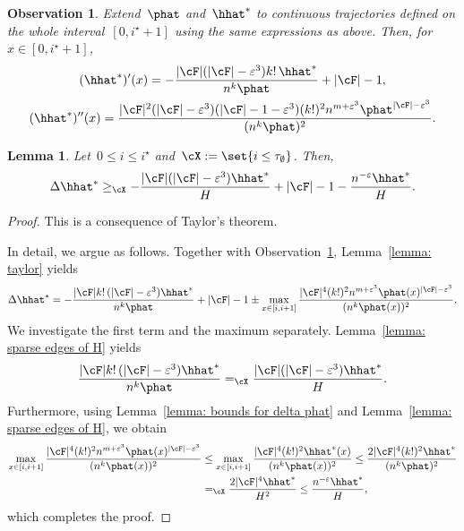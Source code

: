 \documentclass[11pt]{amsart}
\newcommand{\eps}{\varepsilon}
\DeclarePairedDelimiter{\abs}{\lvert}{\rvert}
\newcommand{\Xeq}{=_{\cX}}
\newcommand{\Xgeq}{\geq_{\cX}}
\newtheorem{lemma}[algocf]{Lemma}
\newtheorem{observation}[algocf]{Observation}
\theoremstyle{definition}
\numberwithin{equation}{section}
\begin{document}
	
	\begin{observation}\label{observation: hhat derivatives}
		Extend~$\phat$ and~$\hhat^*$ to continuous trajectories defined on the whole interval~$[0,i^\star+1]$ using the same expressions as above.
		Then, for~$x\in[0,i^\star+1]$,
		\begin{equation*}
			\begin{gathered}
				(\hhat^*)'(x)=-\frac{\abs{\cF}(\abs{\cF}-\eps^3)k!\,\hhat^*}{n^k\phat}+\abs{\cF}-1,\\	(\hhat^*)''(x)=\frac{\abs{\cF}^2(\abs{\cF}-\eps^3)(\abs{\cF}-1-\eps^3)(k!)^2n^{m+\eps^3}\phat^{\abs{\cF}-\eps^3}}{(n^k\phat)^2}.
			\end{gathered}
		\end{equation*}
	\end{observation}
	
	\begin{lemma}\label{lemma: delta hhat star}
		Let~$0\leq i\leq i^\star$ and~$\cX:=\set{i\leq \tau_\emptyset}$.
		Then,
		\begin{equation*}
			\Delta \hhat^*
			\Xgeq -\frac{\abs{\cF}(\abs{\cF}-\eps^3)\hhat^*}{H}+\abs{\cF}-1-\frac{n^{-\eps}\hhat^*}{H}.
		\end{equation*}
	\end{lemma}
	\begin{proof}
		This is a consequence of Taylor's theorem.
		
		In detail, we argue as follows.
		Together with Observation~\ref{observation: hhat derivatives}, Lemma~\ref{lemma: taylor} yields
		\begin{equation*}
			\Delta \hhat^*
			=-\frac{\abs{\cF}k!\,(\abs{\cF}-\eps^3)\hhat^*}{n^k\phat}+\abs{\cF}-1\pm \max_{x\in[i,i+1]} \frac{\abs{\cF}^4 (k!)^2 n^{m+\eps^3}\phat(x)^{\abs{\cF}-\eps^3}}{(n^k\phat(x))^2}.
		\end{equation*}
		We investigate the first term and the maximum separately.
		Lemma~\ref{lemma: sparse edges of H} yields
		\begin{equation*}
			\frac{\abs{\cF}k!\,(\abs{\cF}-\eps^3)\hhat^*}{n^k\phat}
			\Xeq \frac{\abs{\cF}(\abs{\cF}-\eps^3)\hhat^*}{H}.
		\end{equation*}
		Furthermore, using Lemma~\ref{lemma: bounds for delta phat} and Lemma~\ref{lemma: sparse edges of H}, we obtain
		\begin{equation*}
			\begin{aligned}
				\max_{x\in[i,i+1]} \frac{\abs{\cF}^4 (k!)^2 n^{m+\eps^3}\phat(x)^{\abs{\cF}-\eps^3}}{(n^k\phat(x))^2}
				&\leq \max_{x\in[i,i+1]} \frac{\abs{\cF}^4 (k!)^2 \hhat^*(x)}{(n^k\phat(x))^2}
				\leq \frac{2\abs{\cF}^4 (k!)^2 \hhat^*}{(n^k\phat)^2}\\
				&\Xeq \frac{2\abs{\cF}^4 \hhat^*}{H^2}
				\leq \frac{n^{-\eps}\hhat^*}{H},
			\end{aligned}
		\end{equation*}
		which completes the proof.
	\end{proof}
	
\end{document}
